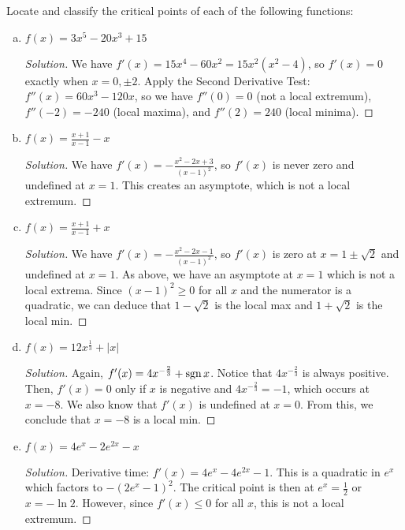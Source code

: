 \question Locate and classify the critical points of each of the following functions:
\begin{enumerate}[(a)]
  \item $f(x) = 3x^5-20x^3+15$
        \begin{proof}[Solution]
          We have $f'(x) = 15x^4-60x^2 = 15x^2(x^2-4)$, so $f'(x)=0$ exactly when $x=0,\pm2$.
          Apply the Second Derivative Test: $f''(x) = 60x^3-120x$, so we have
          $f''(0) = 0$ (not a local extremum), $f''(-2) = -240$ (local maxima), and $f''(2)=240$ (local minima).
        \end{proof}
  \item $f(x) = \frac{x+1}{x-1}-x$
        \begin{proof}[Solution]
          We have $f'(x) = -\frac{x^2-2x+3}{(x-1)^2}$, so $f'(x)$ is never zero and undefined at $x=1$.
          This creates an asymptote, which is not a local extremum.
        \end{proof}
  \item $f(x) = \frac{x+1}{x-1}+x$
        \begin{proof}[Solution]
          We have $f'(x) = -\frac{x^2-2x-1}{(x-1)^2}$, so $f'(x)$ is zero at $x=1\pm\sqrt2$ and undefined at $x=1$.
          As above, we have an asymptote at $x=1$ which is not a local extrema.
          Since $(x-1)^2 \geq 0$ for all $x$ and the numerator is a quadratic, we can deduce that
          $1-\sqrt2$ is the local max and $1+\sqrt2$ is the local min.
        \end{proof}
  \item $f(x) = 12x^{\frac{1}{3}}+|x|$
        \begin{proof}[Solution]
          Again, $f'(x) = 4x^{-\frac23} + \operatorname{sgn} x$.
          Notice that $4x^{-\frac23}$ is always positive.
          Then, $f'(x) = 0$ only if $x$ is negative and $4x^{-\frac23} = -1$, which occurs at $x=-8$.
          We also know that $f'(x)$ is undefined at $x=0$.
          From this, we conclude that $x=-8$ is a local min.
        \end{proof}
  \item $f(x) = 4e^x-2e^{2x}-x$
        \begin{proof}[Solution]
          Derivative time: $f'(x) = 4e^x - 4e^{2x} - 1$.
          This is a quadratic in $e^x$ which factors to $-(2e^x - 1)^2$.
          The critical point is then at $e^x = \frac12$ or $x = -\ln 2$.
          However, since $f'(x) \leq 0$ for all $x$, this is not a local extremum.
        \end{proof}

\end{enumerate}
